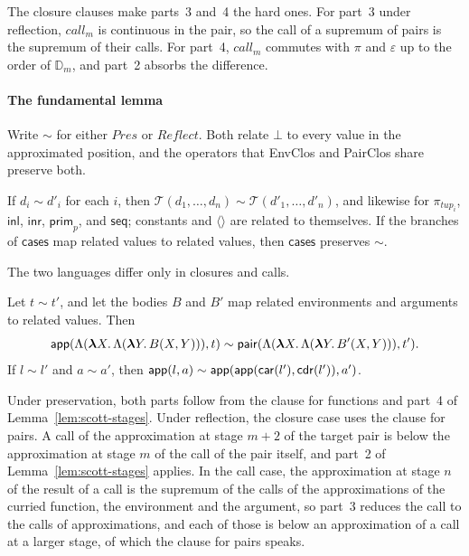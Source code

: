 The closure clauses make parts~3 and~4 the hard ones. For part~3 under
reflection, $\mathit{call}_m$ is continuous in the pair, so the call of
a supremum of pairs is the supremum of their calls. For part~4,
$\mathit{call}_m$ commutes with $\pi$ and $\varepsilon$ up to the order
of $\mathbb{D}_m$, and part~2 absorbs the difference.

\paragraph{The fundamental lemma}

Write $\sim$ for either $\mathit{Pres}$ or $\mathit{Reflect}$. Both relate
$\bot$ to every value in the approximated position, and the operators
that EnvClos and PairClos share preserve both.

\begin{lemma}[Operators]\label{lem:scott-ops}
If $d_i \sim d'_i$ for each $i$, then $\mathcal{T}(d_1, \ldots, d_n)
\sim \mathcal{T}(d'_1, \ldots, d'_n)$, and likewise for
$\pi_{\mathit{tup}_i}$, $\mathsf{inl}$, $\mathsf{inr}$,
$\mathsf{prim}_p$, and $\mathsf{seq}$; constants and $\langle\rangle$
are related to themselves. If the branches of $\mathsf{cases}$ map
related values to related values, then $\mathsf{cases}$ preserves
$\sim$.
\end{lemma}

The two languages differ only in closures and calls.

\begin{lemma}\label{lem:scott-clos}
Let $t \sim t'$, and let the bodies $B$ and $B'$ map related
environments and arguments to related values. Then
\[
  \mathsf{app}(\Lambda(\boldsymbol{\lambda} X.\, \Lambda(\boldsymbol{\lambda} Y.\, B(X, Y))), t)
  \sim
  \mathsf{pair}(\Lambda(\boldsymbol{\lambda} X.\, \Lambda(\boldsymbol{\lambda} Y.\, B'(X, Y))), t').
\]
If $l \sim l'$ and $a \sim a'$, then
$\mathsf{app}(l, a) \sim \mathsf{app}(\mathsf{app}(\mathsf{car}(l'), \mathsf{cdr}(l')), a')$.
\end{lemma}

Under preservation, both parts follow from the clause for functions
and part~4 of Lemma~\ref{lem:scott-stages}. Under reflection, the
closure case uses the clause for pairs. A call of the approximation at
stage $m + 2$ of the target pair is below the approximation at stage
$m$ of the call of the pair itself, and part~2 of
Lemma~\ref{lem:scott-stages} applies. In the call case, the
approximation at stage $n$ of the result of a call is the supremum of
the calls of the approximations of the curried function, the environment and the
argument, so part~3 reduces the call to the calls of approximations,
and each of those is below an approximation of a call at a larger
stage, of which the clause for pairs speaks.

